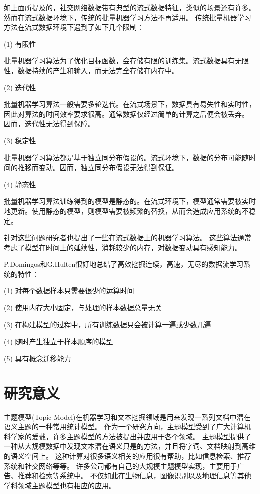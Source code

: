 如上面所提及的，社交网络数据带有典型的流式数据特征，类似的场景还有许多。然而在流式数据环境下，传统的批量机器学习方法不再适用。
传统批量机器学习方法在流式数据环境下遇到了如下几个限制：

(1) 有限性

批量机器学习算法为了优化目标函数，会存储有限的训练集。流式数据具有无限性，数据持续的产生和输入，而无法完全存储在内存中。

(2) 迭代性

批量机器学习算法一般需要多轮迭代。在流式场景下，数据具有易失性和实时性，因此对算法的时间效率要求很高。通常数据仅经过简单的计算之后便会被丢弃。
因而，迭代性无法得到保障。

(3) 稳定性

批量机器学习算法都是基于独立同分布假设的。流式环境下，数据的分布可能随时间的推移而变动。因而，独立同分布假设无法得到保证。

(4) 静态性

批量机器学习算法训练得到的模型是静态的。在流式环境下，模型通常需要被实时地更新。使用静态的模型，则模型需要被频繁的替换，从而会造成应用系统的不稳定。

针对这些问题研究者也提出了一些在流式数据上的机器学习算法。
这些算法通常考虑了模型在时间上的延续性，消耗较少的内存，对数据变动具有感知能力。

P.Domingos和G.Hulten\cite{Domingos01catchingup}很好地总结了高效挖掘连续，高速，无尽的数据流学习系统的特性：

(1) 对每个数据样本只需要很少的运算时间

(2) 使用内存大小固定，与处理的样本数据总量无关

(3) 在构建模型的过程中，所有训练数据只会被计算一遍或少数几遍

(4) 随时产生独立于样本顺序的模型

(5) 具有概念迁移能力

\section{研究意义}
主题模型(Topic Model)在机器学习和文本挖掘领域是用来发现一系列文档中潜在语义主题的一种常用统计模型。
作为一个研究方向，主题模型受到了广大计算机科学家的爱戴，许多主题模型的方法被提出并应用于各个领域。
主题模型提供了一种从大规模数据中发现文本潜在语义只是的方法，并且将字词、文档映射到高维的语义空间上。
这种计算对很多语义相关的应用很有帮助，比如信息检索、推荐系统和社交网络等等。
许多公司都有自己的大规模主题模型实现，主要用于广告、推荐和检索等系统中。
不仅如此在生物信息，图像识别以及地理信息等其他学科领域主题模型也有相应的应用。

